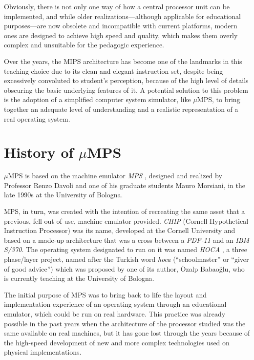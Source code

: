 \documentclass[12pt,a4paper,openright,twoside]{report}
\begin{document}
Obviously, there is not only one way of how a central processor unit can be implemented, and while older realizations---although applicable for educational purposes---are now obsolete and incompatible with current platforms, modern ones are designed to achieve high speed and quality, which makes them overly complex and unsuitable for the pedagogic experience.

Over the years, the MIPS architecture has become one of the landmarks in this teaching choice due to its clean and elegant instruction set, despite being excessively convoluted to student's perception, because of the high level of details obscuring the basic underlying features of it.
A potential solution to this problem is the adoption of a simplified computer system simulator, like $\mu$MPS, to bring together an adequate level of understanding and a realistic representation of a real operating system.

\section{History of $\mu$MPS}
$\mu$MPS is based on the machine emulator \textit{MPS} \cite{mps}, designed and realized by Professor Renzo Davoli and one of his graduate students Mauro Morsiani, in the late 1990s at the University of Bologna.

MPS, in turn, was created with the intention of recreating the same asset that a previous, fell out of use, machine emulator provided.
\textit{CHIP} \cite{chip_1, chip_2} (Cornell Hypothetical Instruction Processor) was its name, developed at the Cornell University and based on a made-up architecture that was a cross between a \textit{PDP-11} and an \textit{IBM S/370}.
The operating system designated to run on it was named \textit{HOCA} \cite{hoca}, a three phase/layer project, named after the Turkish word \textit{hoca} (``schoolmaster'' or ``giver of good advice'') which was proposed by one of its author, Özalp Babaoğlu, who is currently teaching at the University of Bologna.

The initial purpose of MPS was to bring back to life the layout and implementation experience of an operating system through an educational emulator, which could be run on real hardware.
This practice was already possible in the past years when the architecture of the processor studied was the same available on real machines, but it has gone lost through the years because of the high-speed development of new and more complex technologies used on physical implementations.
\end{document}
